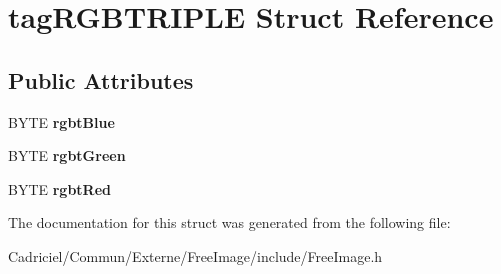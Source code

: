 \hypertarget{structtag_r_g_b_t_r_i_p_l_e}{}\section{tag\+R\+G\+B\+T\+R\+I\+P\+LE Struct Reference}
\label{structtag_r_g_b_t_r_i_p_l_e}
\subsection*{Public Attributes}
\begin{DoxyCompactItemize}
\item 
B\+Y\+TE {\bfseries rgbt\+Blue}\hypertarget{structtag_r_g_b_t_r_i_p_l_e_adbebf9e7802cdfffbdae31c08a71dab7}{}\label{structtag_r_g_b_t_r_i_p_l_e_adbebf9e7802cdfffbdae31c08a71dab7}

\item 
B\+Y\+TE {\bfseries rgbt\+Green}\hypertarget{structtag_r_g_b_t_r_i_p_l_e_a2e3e106422819352693de65189cc341f}{}\label{structtag_r_g_b_t_r_i_p_l_e_a2e3e106422819352693de65189cc341f}

\item 
B\+Y\+TE {\bfseries rgbt\+Red}\hypertarget{structtag_r_g_b_t_r_i_p_l_e_ae61b0771fd3e1e267a3495dcfba5e21c}{}\label{structtag_r_g_b_t_r_i_p_l_e_ae61b0771fd3e1e267a3495dcfba5e21c}

\end{DoxyCompactItemize}


The documentation for this struct was generated from the following file\+:\begin{DoxyCompactItemize}
\item 
Cadriciel/\+Commun/\+Externe/\+Free\+Image/include/Free\+Image.\+h\end{DoxyCompactItemize}
